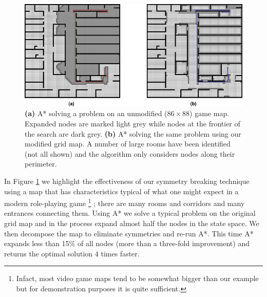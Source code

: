 \begin{figure}[t]
       \begin{center}
           \includegraphics[scale=0.50, trim = 10mm 10mm 10mm 0mm]{diagrams/oha_contrast.png}
       \end{center}
       \caption{\textbf{(a)} A* solving a problem on an unmodified ($86\times88$) game map. 
Expanded nodes are marked light grey while nodes at the frontier of the search are dark grey.
\textbf{(b)} A* solving the same problem using our modified grid map. A number of large rooms have been identified (not
all shown) and the algorithm only considers nodes along their perimeter.}
	\label{fig-contrast}
\end{figure}

In Figure \ref{fig-contrast} we highlight the effectiveness of our symmetry breaking technique using
a map that has characteristics typical of what one might expect in a modern role-playing game \footnote{
Infact, most video game maps tend to be somewhat bigger than our example but for demonstration 
purposes it is quite sufficient.}
; there are many rooms and corridors and many entrances connecting them.
Using A* we solve a typical problem on the original grid map and in the process expand almost half the nodes
in the state space.
We then decompose the map to eliminate symmetries and re-run A*.
This time A* expands less than 15\% of all nodes (more than a three-fold improvement) and returns the 
optimal solution 4 times faster.
